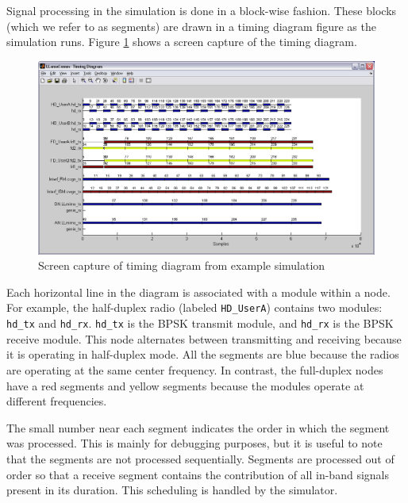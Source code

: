 Signal processing in the simulation is done in a block-wise fashion.
These blocks (which we refer to as segments) are drawn in a timing
diagram figure as the simulation runs.  Figure
\ref{fig:exTimingDiagram} shows a screen capture of the timing
diagram.

\begin{figure}[h]
\centering
\includegraphics[width=6in]{figs/Example_Timing_Diagram}
\caption{Screen capture of timing diagram from example simulation}
\label{fig:exTimingDiagram}
\end{figure}

Each horizontal line in the diagram is associated with a module
within a node.  For example, the half-duplex radio (labeled
\verb+HD_UserA+) contains two modules: \verb+hd_tx+ and
\verb+hd_rx+. \verb+hd_tx+ is the BPSK transmit module, and
\verb+hd_rx+ is the BPSK receive module. This node alternates
between transmitting and receiving because it is operating in
half-duplex mode.  All the segments are blue because the radios are
operating at the same center frequency. In contrast, the full-duplex
nodes have a red segments and yellow segments because the modules
operate at different frequencies.

The small number near each segment indicates the order in which the
segment was processed.  This is mainly for debugging purposes, but
it is useful to note that the segments are not processed
sequentially.  Segments are processed out of order so that a receive
segment contains the contribution of all in-band signals present in
its duration.  This scheduling is handled by the simulator.


